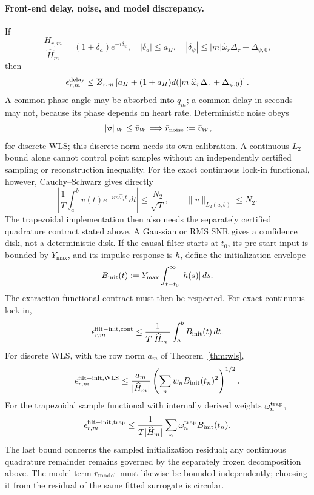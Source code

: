 \documentclass[11pt]{article}
\theoremstyle{definition}
\theoremstyle{remark}
\begin{document}
\paragraph{Front-end delay, noise, and model discrepancy.}
If
\[
 \frac{H_{r,m}}{\widehat H_m}=(1+\delta_a)e^{-i\delta_\psi},\quad
 |\delta_a|\le a_H,\quad
 |\delta_\psi|\le |m|\widehat\omega_r\Delta_\tau+\Delta_{\psi,0},
\]
then
\[
 \epsilon^{\rm delay}_{r,m}\le\overline Z_{r,m}
 \left[a_H+(1+a_H)d(|m|\widehat\omega_r\Delta_\tau+
 \Delta_{\psi,0})\right].
\]
A common phase angle may be absorbed into \(q_m\); a common delay in seconds
may not, because its phase depends on heart rate.  Deterministic noise obeys
\[
 \|\boldsymbol v\|_W\le\bar v_W
 \Longrightarrow
 \bar r_{\rm noise}:=\bar v_W,
\]
for discrete WLS; this discrete norm needs its own calibration.  A continuous
\(L_2\) bound alone cannot control point samples without an independently
certified sampling or reconstruction inequality.  For the exact continuous
lock-in functional, however, Cauchy--Schwarz gives directly
\[
 \left|\frac1T\int_a^b v(t)e^{-im\widehat\omega_rt}\,dt\right|
 \le\frac{N_2}{\sqrt T},
 \qquad \|v\|_{L_2(a,b)}\le N_2.
\]
The trapezoidal implementation then also needs the separately certified
quadrature contract stated above.  A Gaussian or RMS SNR gives a confidence
disk, not a deterministic disk.  If the causal filter starts at \(t_0\), its
pre-start input is bounded by \(Y_{\max}\), and its impulse response is \(h\),
define the initialization envelope
\[
 B_{\rm init}(t):=
 Y_{\max}\int_{t-t_0}^{\infty}|h(s)|\,ds.
\]
The extraction-functional contract must then be respected.  For exact
continuous lock-in,
\[
 \epsilon^{{\rm filt-init},{\rm cont}}_{r,m}\le
 \frac{1}{T|\widehat H_m|}\int_a^bB_{\rm init}(t)\,dt.
\]
For discrete WLS, with the row norm \(a_m\) of
Theorem~\ref{thm:wls},
\[
 \epsilon^{{\rm filt-init},{\rm WLS}}_{r,m}\le
 \frac{a_m}{|\widehat H_m|}
 \left(\sum_nw_nB_{\rm init}(t_n)^2\right)^{1/2}.
\]
For the trapezoidal sample functional with internally derived weights
\(\omega_n^{\rm trap}\),
\[
 \epsilon^{{\rm filt-init},{\rm trap}}_{r,m}\le
 \frac{1}{T|\widehat H_m|}
 \sum_n\omega_n^{\rm trap}B_{\rm init}(t_n).
\]
The last bound concerns the sampled initialization residual; any continuous
quadrature remainder remains governed by the separately frozen decomposition
above.
The model term \(\bar r_{\rm model}\) must likewise be bounded independently;
choosing it from the residual of the same fitted surrogate is circular.
\end{document}
